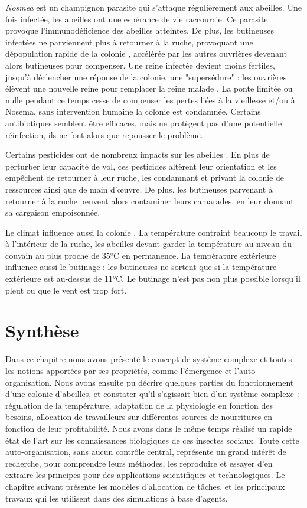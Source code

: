 		\textit{Nosmea} est un champignon parasite qui s'attaque régulièrement aux abeilles. Une fois infectée, les abeilles ont une espérance de vie raccourcie. Ce parasite provoque l'immunodéficience des abeilles atteintes. De plus, les butineuses infectées ne parviennent plus à retourner à la ruche, provoquant une dépopulation rapide de la colonie \cite{higes_how_2008}, accélérée par les autres ouvrières devenant alors butineuses pour compenser. Une reine infectée devient moins fertiles, jusqu'à déclencher une réponse de la colonie, une "supersédure" : les ouvrières élèvent une nouvelle reine pour remplacer la reine malade \cite{alaux_pathological_2011}. La ponte limitée ou nulle pendant ce temps cesse de compenser les pertes liées à la vieillesse et/ou à Nosema, sans intervention humaine la colonie est condamnée. Certains antibiotiques semblent être efficaces, mais ne protègent pas d'une potentielle réinfection, ils ne font alors que repousser le problème.
		
		Certains pesticides ont de nombreux impacts sur les abeilles \cite{betti_bee_2017}. En plus de perturber leur capacité de vol, ces pesticides altèrent leur orientation et les empêchent de retourner à leur ruche, les condamnant et privant la colonie de ressources ainsi que de main d'œuvre. De plus, les butineuses parvenant à retourner à la ruche peuvent alors contaminer leurs camarades, en leur donnant sa cargaison empoisonnée.
		
		Le climat influence aussi la colonie \cite{riviere_toward_2018}. La température contraint beaucoup le travail à l'intérieur de la ruche, les abeilles devant garder la température au niveau du couvain au plus proche de 35°C en permanence. La température extérieure influence aussi le butinage : les butineuses ne sortent que si la température extérieure est au-dessus de 11°C. Le butinage n'est pas non plus possible lorsqu'il pleut ou que le vent est trop fort.
		
			
			
		\section*{Synthèse}
			
		Dans ce chapitre nous avons présenté le concept de système complexe et toutes les notions apportées par ses propriétés, comme l'émergence et l'auto-organisation. Nous avons ensuite pu décrire quelques parties du fonctionnement d'une colonie d'abeilles, et constater qu'il s'agissait bien d'un système complexe : régulation de la température, adaptation de la physiologie en fonction des besoins, allocation de travailleurs sur différentes sources de nourritures en fonction de leur profitabilité. Nous avons dans le même temps réalisé un rapide état de l'art sur les connaissances biologiques de ces insectes sociaux. Toute cette auto-organisation, sans aucun contrôle central, représente un grand intérêt de recherche, pour comprendre leurs méthodes, les reproduire et essayer d'en extraire les principes pour des applications scientifiques et technologiques. Le chapitre suivant présente les modèles d'allocation de tâches, et les principaux travaux qui les utilisent dans des simulations à base d'agents.
